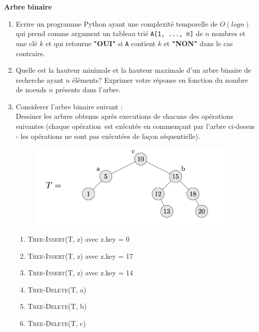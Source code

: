 \begin{Exercice}[20 minutes]\textbf{Arbre binaire}\\
	\begin{enumerate}
		\item Ecrire un programme Python ayant une complexité temporelle de $O(log n)$ qui prend comme argument un tableau trié \lstinline{A[1, ..., n]} de $n$ nombres et une clé $k$ et qui retourne \textbf{"OUI"} si \lstinline{A} contient $k$ et \textbf{"NON"} dans le cas contraire.
		\item Quelle est la hauteur minimale et la hauteur maximale d'un arbre binaire de recherche ayant $n$ éléments? Exprimer votre réponse en fonction du nombre de noeuds $n$ présents dans l'arbre.
		\item Considerer l'arbre binaire suivant : \\
		
		Dessiner les arbres obtenus après executions de chacune des opérations suivantes (chaque opération~est exécutée en commençant par l'arbre ci-dessus - les opérations ne sont pas exécutées de façon séquentielle).
		
		\begin{figure}[h!]
        			\centering
       	 		\includegraphics[width=10cm]{resources/exoArbreBinEnonce.png}
	    	\end{figure}
		\begin{enumerate}
			\item \textsc{Tree-Insert}(T, z) avec z.key = 0
			\item \textsc{Tree-Insert}(T, z) avec z.key = 17
			\item \textsc{Tree-Insert}(T, z) avec z.key = 14
			\item \textsc{Tree-Delete}(T, a)
			\item \textsc{Tree-Delete}(T, b)
			\item \textsc{Tree-Delete}(T, c)
		\end{enumerate}



\end{enumerate}
\end{Exercice}

